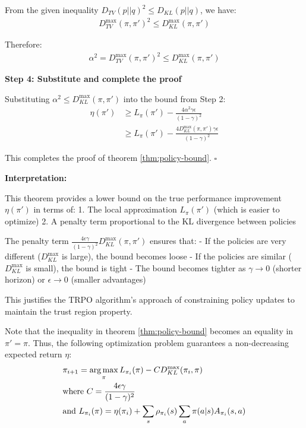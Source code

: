 From the given inequality $D_{TV}(p||q)^2 \le D_{KL}(p||q)$, we have:
\begin{align}
D_{TV}^{\max} (\pi, \pi')^2 \le D_{KL}^{\max}(\pi, \pi')
\end{align}

Therefore:
\begin{align}
\alpha^2 = D_{TV}^{\max} (\pi, \pi')^2 \le D_{KL}^{\max}(\pi, \pi')
\end{align}

\textbf{Step 4: Substitute and complete the proof}

Substituting $\alpha^2 \le D_{KL}^{\max}(\pi, \pi')$ into the bound from Step 2:
\begin{align}
\eta(\pi') &\ge L_{\pi}(\pi') - \frac{4\alpha^2\gamma\epsilon}{(1-\gamma)^2} \\
&\ge L_{\pi}(\pi') - \frac{4D_{KL}^{\max}(\pi, \pi')\gamma\epsilon}{(1-\gamma)^2}
\end{align}

This completes the proof of theorem \ref{thm:policy-bound}. $\square$

\textbf{Interpretation:}

This theorem provides a lower bound on the true performance improvement $\eta(\pi')$ in terms of:
1. The local approximation $L_{\pi}(\pi')$ (which is easier to optimize)
2. A penalty term proportional to the KL divergence between policies

The penalty term $\frac{4\epsilon\gamma}{(1-\gamma)^2}D_{KL}^{\max}(\pi, \pi')$ ensures that:
- If the policies are very different ($D_{KL}^{\max}$ is large), the bound becomes loose
- If the policies are similar ($D_{KL}^{\max}$ is small), the bound is tight
- The bound becomes tighter as $\gamma \to 0$ (shorter horizon) or $\epsilon \to 0$ (smaller advantages)

This justifies the TRPO algorithm's approach of constraining policy updates to maintain the trust region property.


Note that the inequality in theorem \ref{thm:policy-bound} becomes an equality in $\pi' = \pi$. Thus, the following optimization problem guarantees a non-decreasing expected return $\eta$:
\begin{align*}
    &\pi_{i + 1} = \operatorname*{arg\,max}_{\pi} L_{\pi_i}(\pi) - CD_{KL}^{\max}(\pi_i, \pi)\\
    &\text{where } C = \frac{4\epsilon\gamma}{(1-\gamma)^2}\\
    &\text{and } L_{\pi_i}(\pi) = \eta(\pi_i) + \sum_{s}\rho_{\pi_i}(s)\sum_{a}\pi(a|s)A_{\pi_i}(s, a)
\end{align*}

